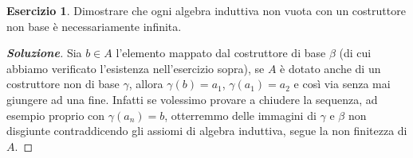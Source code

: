 \documentclass{article}
\theoremstyle{definition}
\newtheorem{esercizio}{Esercizio}
\theoremstyle{definition}
\theoremstyle{definition}
\theoremstyle{remark}
\begin{document}
    \begin{esercizio}
        Dimostrare che ogni algebra induttiva non vuota con un
        costruttore non base è necessariamente infinita.
    \end{esercizio}
    \begin{proof}[\textbf{Soluzione}] Sia $b\in A$  l'elemento mappato dal costruttore di base $\beta$ (di cui abbiamo
        verificato l'esistenza nell'esercizio sopra), se $A$ è dotato anche di un costruttore
        non di base $\gamma$, allora $\gamma(b) = a_1$, $\gamma(a_1) = a_2$ e così via senza mai giungere ad una fine.
        Infatti se volessimo provare a chiudere la sequenza, ad esempio proprio con $\gamma(a_n)=b$, otterremmo delle
        immagini di $\gamma$ e $\beta$ non disgiunte contraddicendo gli assiomi di algebra induttiva, segue la non finitezza di $A$.
    \end{proof}
\end{document}
